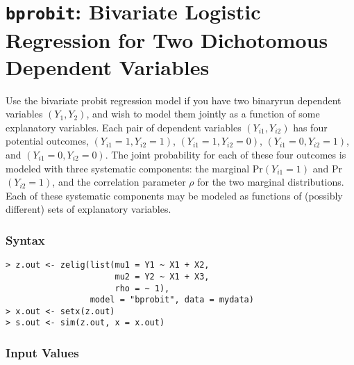 




\section{{\tt bprobit}: Bivariate Logistic Regression for Two
Dichotomous Dependent Variables}\label{bprobit}

Use the bivariate probit regression model if you have two binaryrun
dependent variables $(Y_1, Y_2)$, and wish to model them jointly as a
function of some explanatory variables.  Each pair of dependent
variables $(Y_{i1}, Y_{i2})$ has four potential outcomes, $(Y_{i1}=1,
Y_{i2}=1)$, $(Y_{i1}=1, Y_{i2}=0)$, $(Y_{i1}=0, Y_{i2}=1)$, and
$(Y_{i1}=0, Y_{i2}=0)$.  The joint probability for each of these four
outcomes is modeled with three systematic components: the marginal
Pr$(Y_{i1} = 1)$ and Pr$(Y_{i2} = 1)$, and the correlation parameter
$\rho$ for the two marginal distributions.  Each of these systematic
components may be modeled as functions of (possibly different) sets of
explanatory variables.

\subsubsection{Syntax}

\begin{verbatim}
> z.out <- zelig(list(mu1 = Y1 ~ X1 + X2, 
                      mu2 = Y2 ~ X1 + X3,
                      rho = ~ 1),
                 model = "bprobit", data = mydata)
> x.out <- setx(z.out)
> s.out <- sim(z.out, x = x.out)
\end{verbatim}

\subsubsection{Input Values}

